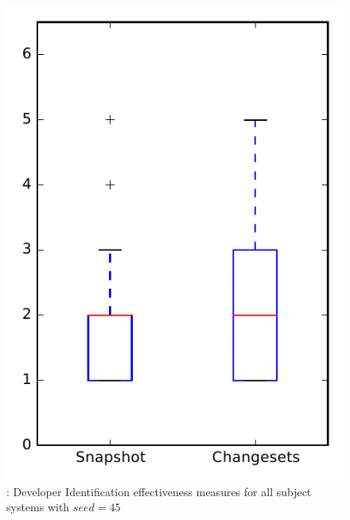 
\begin{figure}
\centering
\includegraphics[height=0.4\textheight]{figures/dit_seed/rq1_overview_45}
\caption{\rtwo: Developer Identification effectiveness measures for all subject systems with $seed=45$}
\label{fig:dit_seed:rq1:overview}
\end{figure}
